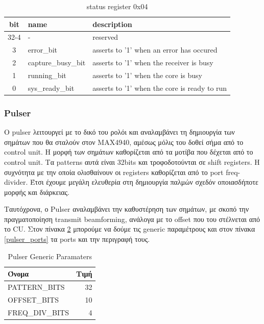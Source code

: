 \documentclass[12pt,a4paper]{book}
\begin{document}
\begin{table}
\begin{tabularx}{\linewidth}{|c|l|X|}
\hline 
bit & name & description \\
\hline
\hline
32-4 & - & reserved \\
\hline
3 & error\_bit & asserts to '1' when an error has occured  \\
\hline
2 &  capture\_busy\_bit & asserts to '1' when the receiver is busy\\
\hline
1 & running\_bit & asserts to '1' when the core is busy\\
\hline
0 & sys\_ready\_bit & asserts to '1' when the core is ready to run \\
\hline
\end{tabularx} 
\caption{status register 0x04}
\label{status_reg} 
\end{table} 




\newpage
\subsubsection{Pulser}
O pulser λειτουργεί με το δικό του ρολόι και αναλαμβάνει τη δημιουργία των σημάτων που θα σταλούν στον MAX4940, αμέσως μόλις του δοθεί σήμα από το control unit. Η μορφή των σημάτων καθορίζεται από τα μοτίβα που δέχεται από το control unit. Τα patterns αυτά είναι 32bits και τροφοδοτούνται σε shift registers. Η συχνότητα με την οποία ολισθαίνουν οι registers καθορίζεται από το port freq-divider. Έτσι έχουμε μεγάλη ελευθερία στη δημιουργία παλμών σχεδόν οποιασδήποτε μορφής και διάρκειας.


Ταυτόχρονα, ο Pulser  αναλαμβάνει την καθυστέρηση των σημάτων, με σκοπό την πραγματοποίηση transmit beamforming, ανάλογα με το offset που του στέλνεται από το CU. Στον πίνακα \ref{pulser_generics} μπορούμε να δούμε τις generic παραμέτρους και στον πίνακα \ref{pulser_ports} τα ports  και την περιγραφή τους.

\begin{table}
\center
\begin{tabular}{|l|r|}
\hline 
Όνομα & Τιμή \\ 
\hline 
\hline 
PATTERN\_BITS & 32 \\ 
\hline 
OFFSET\_BITS & 10 \\ 
\hline 
FREQ\_DIV\_BITS & 4 \\ 
\hline 
\end{tabular} 
\caption{Pulser Generic Paramaters}
\label{pulser_generics} 
\end{table} 
\end{document}
